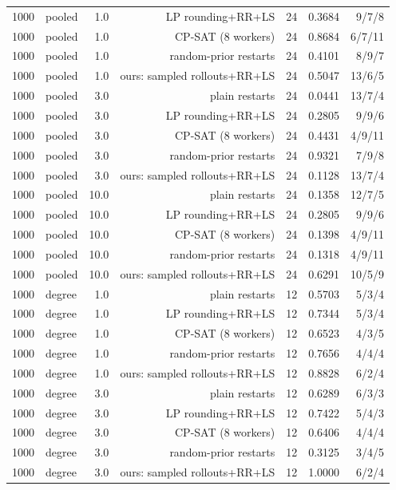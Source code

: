 \begin{table}[t]
\begin{tabular}{llrrrrr}
1000 & pooled & 1.0 & LP rounding+RR+LS & 24 & 0.3684 & 9/7/8 \\
1000 & pooled & 1.0 & CP-SAT (8 workers) & 24 & 0.8684 & 6/7/11 \\
1000 & pooled & 1.0 & random-prior restarts & 24 & 0.4101 & 8/9/7 \\
1000 & pooled & 1.0 & ours: sampled rollouts+RR+LS & 24 & 0.5047 & 13/6/5 \\
1000 & pooled & 3.0 & plain restarts & 24 & 0.0441 & 13/7/4 \\
1000 & pooled & 3.0 & LP rounding+RR+LS & 24 & 0.2805 & 9/9/6 \\
1000 & pooled & 3.0 & CP-SAT (8 workers) & 24 & 0.4431 & 4/9/11 \\
1000 & pooled & 3.0 & random-prior restarts & 24 & 0.9321 & 7/9/8 \\
1000 & pooled & 3.0 & ours: sampled rollouts+RR+LS & 24 & 0.1128 & 13/7/4 \\
1000 & pooled & 10.0 & plain restarts & 24 & 0.1358 & 12/7/5 \\
1000 & pooled & 10.0 & LP rounding+RR+LS & 24 & 0.2805 & 9/9/6 \\
1000 & pooled & 10.0 & CP-SAT (8 workers) & 24 & 0.1398 & 4/9/11 \\
1000 & pooled & 10.0 & random-prior restarts & 24 & 0.1318 & 4/9/11 \\
1000 & pooled & 10.0 & ours: sampled rollouts+RR+LS & 24 & 0.6291 & 10/5/9 \\
1000 & degree & 1.0 & plain restarts & 12 & 0.5703 & 5/3/4 \\
1000 & degree & 1.0 & LP rounding+RR+LS & 12 & 0.7344 & 5/3/4 \\
1000 & degree & 1.0 & CP-SAT (8 workers) & 12 & 0.6523 & 4/3/5 \\
1000 & degree & 1.0 & random-prior restarts & 12 & 0.7656 & 4/4/4 \\
1000 & degree & 1.0 & ours: sampled rollouts+RR+LS & 12 & 0.8828 & 6/2/4 \\
1000 & degree & 3.0 & plain restarts & 12 & 0.6289 & 6/3/3 \\
1000 & degree & 3.0 & LP rounding+RR+LS & 12 & 0.7422 & 5/4/3 \\
1000 & degree & 3.0 & CP-SAT (8 workers) & 12 & 0.6406 & 4/4/4 \\
1000 & degree & 3.0 & random-prior restarts & 12 & 0.3125 & 3/4/5 \\
1000 & degree & 3.0 & ours: sampled rollouts+RR+LS & 12 & 1.0000 & 6/2/4 \\

\end{tabular}
\end{table}
